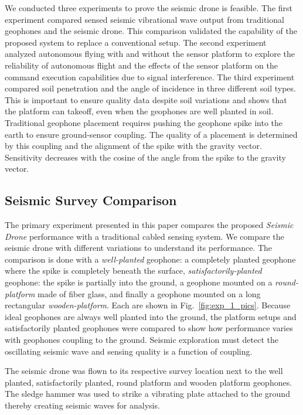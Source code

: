 We conducted three experiments to prove the seismic drone is feasible. The first experiment compared sensed seismic vibrational wave output from traditional geophones and the seismic drone. This comparison validated the capability  of the proposed system to replace a conventional setup. The second experiment analyzed autonomous flying with and without the sensor platform to explore the reliability of autonomous flight and the effects of the sensor platform on the command execution capabilities due to signal interference. The third experiment compared soil penetration and the angle of incidence in three different soil types. This is important to ensure quality data despite soil variations and shows that the platform can takeoff, even when the geophones are well planted in soil. Traditional geophone placement requires pushing the geophone spike into the earth to ensure ground-sensor coupling. The quality of a placement is determined by this coupling and the alignment of the spike with the gravity vector. Sensitivity decreases with the cosine of the angle from the spike to the gravity vector.

\subsection{Seismic Survey Comparison}

The primary experiment presented in this paper compares the proposed \emph{Seismic Drone} performance with a traditional cabled sensing system. We compare the seismic drone with different variations to understand its performance. The comparison is done with a \emph{well-planted} geophone: a completely planted geophone where the spike is completely beneath the surface, \emph{satisfactorily-planted} geophone: the spike is partially into the ground, a geophone mounted on a \emph{round-platform} made of fiber glass, and finally a geophone mounted on a long rectangular \emph{wooden-platform}. Each are shown in Fig.~\ref{fig:exp_1_pics}. Because ideal geophones are always well planted into the ground, the platform setups and satisfactorily planted geophones were compared to show how performance varies with geophones coupling to the ground. Seismic exploration must detect the oscillating seismic wave and sensing quality is a function of coupling. 

The seismic drone was flown to its respective survey location next to the well planted, satisfactorily planted, round platform and wooden platform geophones. The sledge hammer was used to strike a vibrating plate attached to the ground thereby creating seismic waves for analysis.

